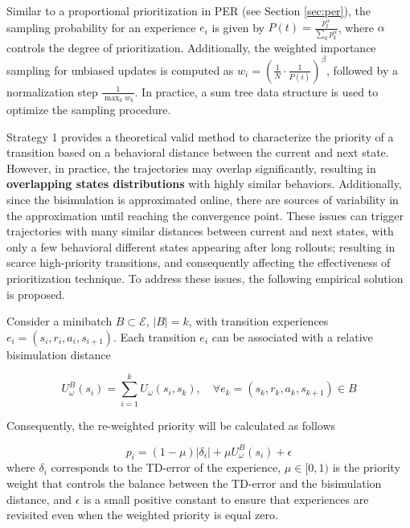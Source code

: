 Similar to a proportional prioritization in PER \cite{schaul2015prioritized} (see Section \ref{sec:per}), the sampling probability for an experience $e_i$ is given by $P(t) = \frac{p_t^\alpha}{\sum_k p_k^\alpha}$, where $\alpha$ controls the degree of prioritization. Additionally, the weighted importance sampling for unbiased updates is computed as $w_i = \left(\frac{1}{N} \cdot \frac{1}{P(i)} \right)^\beta$, followed by a normalization step $\frac{1}{\max_k w_k}$. In practice, a sum tree data structure is used to optimize the sampling procedure.

Strategy 1 provides a theoretical valid method to characterize the priority of a transition based on a behavioral distance between the current and next state. However, in practice, the trajectories may overlap significantly, resulting in \textbf{overlapping states distributions} with highly similar behaviors. Additionally, since the bisimulation is approximated online, there are sources of variability in the approximation until reaching the convergence point. These issues can trigger trajectories with many similar distances between current and next states, with only a few behavioral different states appearing after long rollouts; resulting in scarce high-priority transitions, and consequently affecting the effectiveness of prioritization technique. To address these issues, the following empirical solution is proposed. 

\begin{strategy}
Consider a minibatch $B \subset \mathcal{E}$, $|B| = k$, with transition experiences $e_i = (s_i, r_i, a_i, s_{i+1})$. Each transition $e_i$ can be associated with a relative bisimulation distance

\begin{equation}
    U^B_\omega(s_i) = \sum_{i=1}^k U_\omega(s_i, s_k), \quad \forall e_k = (s_k, r_k, a_k, s_{k+1}) \in B
\end{equation}

Consequently, the re-weighted priority will be calculated as follows

\begin{equation}
    p_i = (1 - \mu) |\delta_i| + \mu U^B_\omega(s_i) + \epsilon
\end{equation}
where \(\delta_i\) corresponds to the TD-error of the experience, \(\mu \in [0,1)\) is the priority weight that controls the balance between the TD-error and the bisimulation distance, and \(\epsilon\) is a small positive constant to ensure that experiences are revisited even when the weighted priority is equal zero.
\end{strategy}



